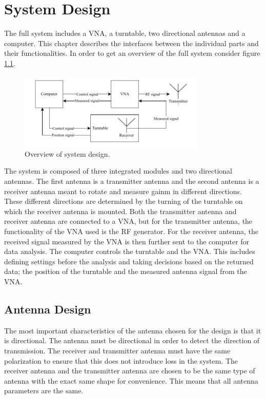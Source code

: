 \chapter{System Design} \label{ch:design}
The full system includes a VNA, a turntable, two directional antennas and a computer. This chapter describes the interfaces between the individual parts and their functionalities. In order to get an overview of the full system consider figure \ref{fig:system_design}.
\begin{figure}[H]
    \centering
    \includegraphics[width=0.8\textwidth]{figures/system_design.pdf}
    \caption{Overview of system design.} \label{fig:system_design}
\end{figure}
The system is composed of three integrated modules and two directional antennas. The first antenna is a transmitter antenna and the second antenna is a receiver antenna meant to rotate and measure gainm in different directions. These different directions are determined by the turning of the turntable on which the receiver antenna is mounted. Both the transmitter antenna and receiver antenna are connected to a VNA, but for the transmitter antenna, the functionality of the VNA used is the RF generator. For the receiver antenna, the received signal measured by the VNA is then further sent to the computer for data analysis. The computer controls the turntable and the VNA. This includes defining settings before the analysis and taking decisions based on the returned data; the position of the turntable and the measured antenna signal from the VNA. 


\section{Antenna Design} \label{s:ant_design}
The most important characteristics of the antenna chosen for the design is that it is directional. The antenna must be directional in order to detect the direction of transmission. The receiver and transmitter antenna must have the same polarization to ensure that this does not introduce loss in the system. The receiver antenna and the transmitter antenna are chosen to be the same type of antenna with the exact same shape for convenience. This means that all antenna parameters are the same. 

